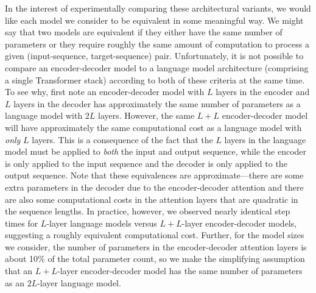 \documentclass[twoside,11pt]{article}
\begin{document}
In the interest of experimentally comparing these architectural variants, we would like each model we consider to be equivalent in some meaningful way.
We might say that two models are equivalent if they either have the same number of parameters or they require roughly the same amount of computation to process a given (input-sequence, target-sequence) pair.
Unfortunately, it is not possible to compare an encoder-decoder model to a language model architecture (comprising a single Transformer stack) according to both of these criteria at the same time.
To see why, first note an encoder-decoder model with $L$ layers in the encoder and $L$ layers in the decoder has approximately the same number of parameters as a language model with $2L$ layers.
However, the same $L + L$ encoder-decoder model will have approximately the same computational cost as a language model with \textit{only} $L$ layers.
This is a consequence of the fact that the $L$ layers in the language model must be applied to \textit{both} the input and output sequence, while the encoder is only applied to the input sequence and the decoder is only applied to the output sequence.
Note that these equivalences are approximate---there are some extra parameters in the decoder due to the encoder-decoder attention and there are also some computational costs in the attention layers that are quadratic in the sequence lengths.
In practice, however, we observed nearly identical step times for $L$-layer language models versus $L + L$-layer encoder-decoder models, suggesting a roughly equivalent computational cost.
Further, for the model sizes we consider, the number of parameters in the encoder-decoder attention layers is about 10\% of the total parameter count, so we make the simplifying assumption that an $L + L$-layer encoder-decoder model has the same number of parameters as an $2L$-layer language model.
\end{document}
